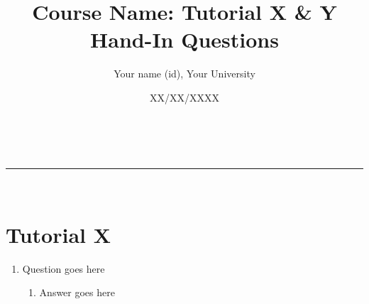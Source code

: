 \documentclass[a4paper,11pt]{article}
\makeatletter
\newcommand{\linia}{\rule{\linewidth}{0.5pt}}
\renewcommand{\maketitle}{
\begin{center}
\vspace{2ex}
{\huge \textsc{\@title}}
\vspace{1ex}
\\
\linia\\
\@author \hfill \@date
\vspace{4ex}
\end{center}
}
\makeatother
\begin{document}
\title{Course Name: Tutorial X \& Y Hand-In Questions}
\author{Your name (id), Your University}
\date{XX/XX/XXXX}

\maketitle

\section*{Tutorial X}
\begin{enumerate}[H1.]
\item Question goes here
\begin{enumerate}[(Ans.)]
\item Answer goes here
\end{enumerate}
\end{enumerate}
\end{document}
